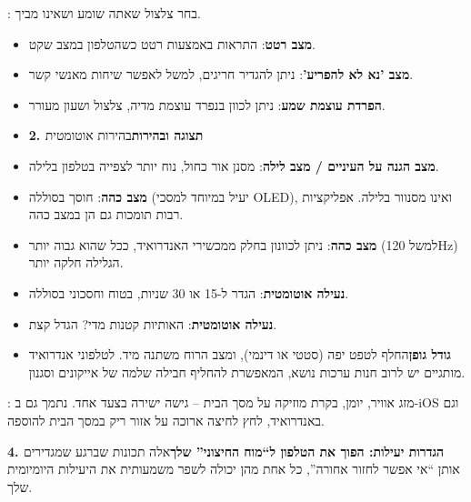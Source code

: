 


: בחר צלצול שאתה שומע ושאינו מביך.

\begin{itemize}
  \item \textbf{מצב רטט}: התראות באמצעות רטט כשהטלפון במצב שקט.
  \item \textbf{מצב 'נא לא להפריע'}: ניתן להגדיר חריגים, למשל לאפשר שיחות מאנשי קשר.
  \item \textbf{הפרדת עוצמת שמע}: ניתן לכוון בנפרד עוצמת מדיה, צלצול ושעון מעורר.
  \item \textbf{2. תצוגה ובהירות}בהירות אוטומטית
\end{itemize}


\begin{itemize}
  \item \textbf{מצב הגנה על העיניים / מצב לילה}: מסנן אור כחול, נוח יותר לצפייה בטלפון בלילה.
  \item \textbf{מצב כהה}: חוסך בסוללה (יעיל במיוחד למסכי OLED), ואינו מסנוור בלילה. אפליקציות רבות תומכות גם הן במצב כהה.
  \item \textbf{מצב כהה}: ניתן לכוונון בחלק ממכשירי האנדרואיד, ככל שהוא גבוה יותר (למשל 120Hz) הגלילה חלקה יותר.
  \item \textbf{נעילה אוטומטית}: הגדר ל-15 או 30 שניות, בטוח וחסכוני בסוללה.
  \item \textbf{נעילה אוטומטית}: האותיות קטנות מדי? הגדל קצת.
  \item \textbf{גודל גופן}החלף לטפט יפה (סטטי או דינמי), ומצב הרוח משתנה מיד. לטלפוני אנדרואיד מותגיים יש לרוב חנות ערכות נושא, המאפשרת להחליף חבילה שלמה של אייקונים וסגנון.
\end{itemize}


: מזג אוויר, יומן, בקרת מוזיקה על מסך הבית – גישה ישירה בצעד אחד. נתמך גם ב-iOS וגם באנדרואיד, לחץ לחיצה ארוכה על אזור ריק במסך הבית להוספה.

\textbf{4. הגדרות יעילות: הפוך את הטלפון ל“מוח החיצוני” שלך}אלה תכונות שברגע שמגדירים אותן “אי אפשר לחזור אחורה”, כל אחת מהן יכולה לשפר משמעותית את היעילות היומיומית שלך.

